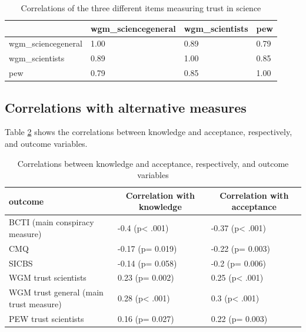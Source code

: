 \documentclass[
  doc,floatsintext]{apa6}
\begin{document}
\begin{table}[h]

\begin{center}
\begin{threeparttable}

\caption{\label{tab:exp2-correlation-trust}Correlations of the three different items measuring trust in science}

\begin{tabular}{llll}
\toprule
 & \multicolumn{1}{c}{wgm\_sciencegeneral} & \multicolumn{1}{c}{wgm\_scientists} & \multicolumn{1}{c}{pew}\\
\midrule
wgm\_sciencegeneral & 1.00 & 0.89 & 0.79\\
wgm\_scientists & 0.89 & 1.00 & 0.85\\
pew & 0.79 & 0.85 & 1.00\\
\bottomrule
\end{tabular}

\end{threeparttable}
\end{center}

\end{table}

\subsection{Correlations with alternative measures}\label{correlations-with-alternative-measures-1}

Table \ref{tab:exp2-correlations-outcomes} shows the correlations between knowledge and acceptance, respectively, and outcome variables.

\begin{table}[tbp]

\begin{center}
\begin{threeparttable}

\caption{\label{tab:exp2-correlations-outcomes}Correlations between knowledge and acceptance, respectively, and outcome variables}

\begin{tabular}{lll}
\toprule
outcome & \multicolumn{1}{c}{Correlation with knowledge} & \multicolumn{1}{c}{Correlation with acceptance}\\
\midrule
BCTI 
(main conspiracy measure) & -0.4 (p< .001) & -0.37 (p< .001)\\
CMQ & -0.17 (p= 0.019) & -0.22 (p= 0.003)\\
SICBS & -0.14 (p= 0.058) & -0.2 (p= 0.006)\\
WGM trust scientists & 0.23 (p= 0.002) & 0.25 (p< .001)\\
WGM trust general 
(main trust measure) & 0.28 (p< .001) & 0.3 (p< .001)\\
PEW trust scientists & 0.16 (p= 0.027) & 0.22 (p= 0.003)\\
\bottomrule
\end{tabular}

\end{threeparttable}
\end{center}

\end{table}
\end{document}
